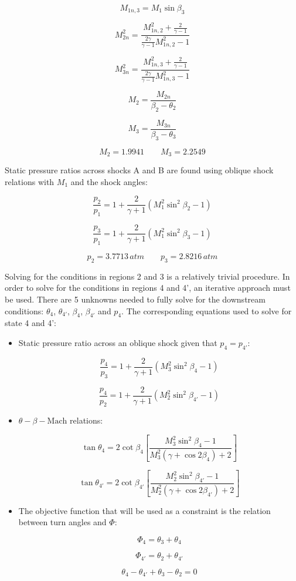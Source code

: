 \documentclass[../main.tex]{subfiles}
\begin{document}
\[
    M_{1n,3} = M_1 \sin{\beta_3}
\]

\[
    M_{2n}^2
    =
    \frac{M_{1n,2}^2 + \frac{2}{\gamma-1}}{\frac{2\gamma}{\gamma-1}M_{1n,2}^2-1}
\]

\[
    M_{3n}^2
    =
    \frac{M_{1n,3}^2 + \frac{2}{\gamma-1}}{\frac{2\gamma}{\gamma-1}M_{1n,3}^2-1}
\]

\[
    M_2 = \frac{M_{2n}}{\beta_2-\theta_2}
\]

\[
    M_3 = \frac{M_{3n}}{\beta_3-\theta_3}
\]

\[
    \boxed{
    M_2 = 1.9941 \quad\quad M_3 = 2.2549
    }
\]

Static pressure ratios across shocks A and B are found using oblique shock relations with \(M_1\) and the shock angles:  

\[
    \frac{p_2}{p_1}
    =
    1 + \frac{2}{\gamma+1}
    \left({
    M_1^2 \sin^2{\beta_2} - 1
    }\right)
\]

\[
    \frac{p_3}{p_1}
    =
    1 + \frac{2}{\gamma+1}
    \left({
    M_1^2 \sin^2{\beta_3} - 1
    }\right)
\]

\[
    \boxed{
    p_2 = 3.7713 \, \unit{atm} \quad\quad p_3 = 2.8216 \, \unit{atm}  
    }
\]

Solving for the conditions in regions 2 and 3 is a relatively trivial procedure.
In order to solve for the conditions in regions 4 and 4', an iterative approach must be used.
There are 5 unknowns needed to fully solve for the downstream conditions: \(\theta_4\), \(\theta_{4'}\), \(\beta_4\), \(\beta_{4'}\) and \(p_4\).
The corresponding equations used to solve for state 4 and 4':

\begin{itemize}

    \item Static pressure ratio across an oblique shock given that \(p_4 = p_{4'}\):

\[
    \frac{p_4}{p_3}
    =
    1 + \frac{2}{\gamma+1}
    \left({
    M_3^2 \sin^2{\beta_4} - 1
    }\right)
\]

\[
    \frac{p_{4}}{p_2}
    =
    1 + \frac{2}{\gamma+1}
    \left({
    M_2^2 \sin^2{\beta_{4'}} - 1
    }\right)
\]

\item \(\theta-\beta-\textrm{Mach}\) relations:

\[
    \tan{\theta_4}
    =
    2 \cot{\beta_4}
    \left[{
    \frac{M_3^2\sin^2{\beta_4}-1}{M_3^2\left({\gamma+\cos{2\beta_4}}\right)+2}
    }\right]
\]

\[
    \tan{\theta_{4'}}
    =
    2 \cot{\beta_{4'}}
    \left[{
    \frac{M_2^2\sin^2{\beta_{4'}}-1}{M_2^2\left({\gamma+\cos{2\beta_{4'}}}\right)+2}
    }\right]
\]

\item The objective function that will be used as a constraint is the relation between turn angles and \(\Phi\):

\[
    \Phi_4 =  \theta_3  + \theta_4
\]

\[
    \Phi_{4'} = \theta_2 + \theta_{4'}  
\]

\[
    \boxed{
    \theta_4  - \theta_{4'} + \theta_3 - \theta_2 = 0
    }
\]

\end{itemize}
\end{document}
